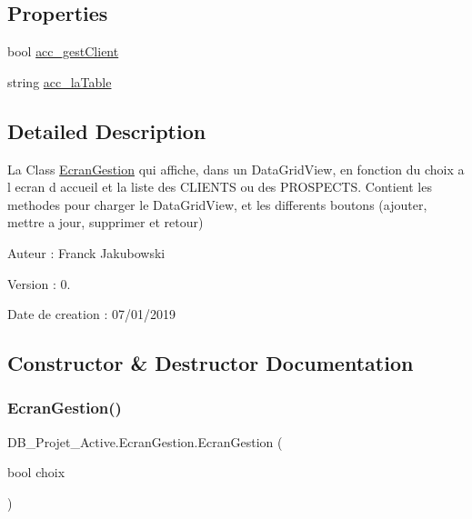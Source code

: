 \subsection*{Properties}
\begin{DoxyCompactItemize}
\item 
bool \mbox{\hyperlink{class_d_b___projet___active_1_1_ecran_gestion_ab89bcfdd417751d779f79f1fcda817f6}{acc\+\_\+gest\+Client}}
\item 
string \mbox{\hyperlink{class_d_b___projet___active_1_1_ecran_gestion_a84691d002fb4a2cc3be13bd6b6670246}{acc\+\_\+la\+Table}}
\end{DoxyCompactItemize}


\subsection{Detailed Description}
La Class \mbox{\hyperlink{class_d_b___projet___active_1_1_ecran_gestion}{Ecran\+Gestion}} qui affiche, dans un Data\+Grid\+View, en fonction du choix a l ecran d accueil et la liste des C\+L\+I\+E\+N\+TS ou des P\+R\+O\+S\+P\+E\+C\+TS. Contient les methodes pour charger le Data\+Grid\+View, et les differents boutons (ajouter, mettre a jour, supprimer et retour) 

Auteur \+: Franck Jakubowski

Version \+: 0.

Date de creation \+: 07/01/2019

\subsection{Constructor \& Destructor Documentation}
\mbox{\label{class_d_b___projet___active_1_1_ecran_gestion_a273feee2e71a07ebae1144b2fd37c57f}} 
\subsubsection{\texorpdfstring{EcranGestion()}{EcranGestion()}}
{\footnotesize\ttfamily D\+B\+\_\+\+Projet\+\_\+\+Active.\+Ecran\+Gestion.\+Ecran\+Gestion (\begin{DoxyParamCaption}\item[{bool}]{choix }\end{DoxyParamCaption})}



